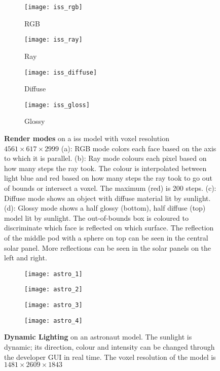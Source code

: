 \begin{figure}[H]
  \centering
  \begin{subfigure}[b]{0.48\textwidth}
    \texttt{[image: iss\_rgb]}
    \caption{RGB}
  \end{subfigure}
  \hfill
  \begin{subfigure}[b]{0.48\textwidth}
    \texttt{[image: iss\_ray]}
    \caption{Ray}
  \end{subfigure}
  \begin{subfigure}[b]{0.48\textwidth}
    \texttt{[image: iss\_diffuse]}
    \caption{Diffuse}
  \end{subfigure}
  \hfill
  \begin{subfigure}[b]{0.48\textwidth}
    \texttt{[image: iss\_gloss]}
    \caption{Glossy}
  \end{subfigure}
  \caption{\textbf{Render modes} on a \acrshort{iss} model with voxel resolution $4561\times617\times2999$
    (a): RGB mode colors each face based on the axis to which it is parallel.
    (b): Ray mode colours each pixel based on how many steps the ray took. The colour is interpolated between light blue and red based on how many steps the ray took to go out of bounds or intersect a voxel. The maximum (red) is 200 steps.
    (c): Diffuse mode shows an object with diffuse material lit by sunlight.
    (d): Glossy mode shows a half glossy (bottom), half diffuse (top) model lit by sunlight. The out-of-bounds box is coloured to discriminate which face is reflected on which surface. The reflection of the middle pod with a sphere on top can be seen in the central solar panel. More reflections can be seen in the solar panels on the left and right.
  }
  \label{rendermods}
\end{figure}


\begin{figure}[H]
  \centering
  \begin{subfigure}[b]{0.48\textwidth}
    \texttt{[image: astro\_1]}
  \end{subfigure}
  \hfill
  \begin{subfigure}[b]{0.48\textwidth}
    \texttt{[image: astro\_2]}
  \end{subfigure}
  \begin{subfigure}[b]{0.48\textwidth}
    \texttt{[image: astro\_3]}
  \end{subfigure}
  \hfill
  \begin{subfigure}[b]{0.48\textwidth}
    \texttt{[image: astro\_4]}
  \end{subfigure}
  \caption{\textbf{Dynamic Lighting} on an astronaut model. The sunlight is dynamic; its direction, colour and intensity can be changed through the developer GUI in real time. The voxel resolution of the model is $1481\times2609\times1843$}
\end{figure}

